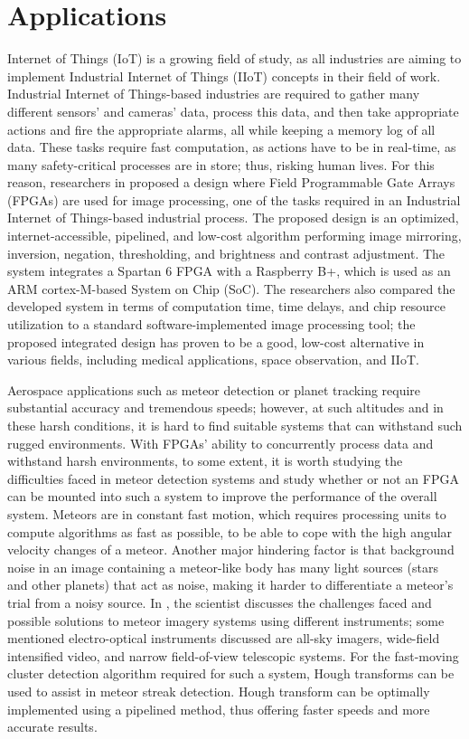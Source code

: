 \section{Applications}
\par	Internet of Things (IoT) is a growing field of study, as all industries are aiming to implement Industrial Internet of Things (IIoT) concepts in their field of work. Industrial Internet of Things-based industries are required to gather many different sensors’ and cameras’ data, process this data, and then take appropriate actions and fire the appropriate alarms, all while keeping a memory log of all data. These tasks require fast computation, as actions have to be in real-time, as many safety-critical processes are in store; thus, risking human lives.  For this reason, researchers in \cite{twenty_two} proposed a design where Field Programmable Gate Arrays (FPGAs) are used for image processing, one of the tasks required in an Industrial Internet of Things-based industrial process. The proposed design is an optimized, internet-accessible, pipelined, and low-cost algorithm performing image mirroring, inversion, negation, thresholding, and brightness and contrast adjustment. The system integrates a Spartan 6 FPGA with a Raspberry B+, which is used as an ARM cortex-M-based System on Chip (SoC). The researchers also compared the developed system in terms of computation time, time delays, and chip resource utilization to a standard software-implemented image processing tool; the proposed integrated design has proven to be a good, low-cost alternative in various fields, including medical applications, space observation, and IIoT. \newline
\par	Aerospace applications such as meteor detection or planet tracking require substantial accuracy and tremendous speeds; however, at such altitudes and in these harsh conditions, it is hard to find suitable systems that can withstand such rugged environments. With FPGAs’ ability to concurrently process data and withstand harsh environments, to some extent, it is worth studying the difficulties faced in meteor detection systems and study whether or not an FPGA can be mounted into such a system to improve the performance of the overall system. Meteors are in constant fast motion, which requires processing units to compute algorithms as fast as possible, to be able to cope with the high angular velocity changes of a meteor. Another major hindering factor is that background noise in an image containing a meteor-like body has many light sources (stars and other planets) that act as noise, making it harder to differentiate a meteor’s trial from a noisy source. In \cite{twenty_four}, the scientist discusses the challenges faced and possible solutions to meteor imagery systems using different instruments; some mentioned electro-optical instruments discussed are all-sky imagers, wide-field intensified video, and narrow field-of-view telescopic systems. For the fast-moving cluster detection algorithm required for such a system, Hough transforms can be used to assist in meteor streak detection. Hough transform can be optimally implemented using a pipelined method, thus offering faster speeds and more accurate results. \newline
